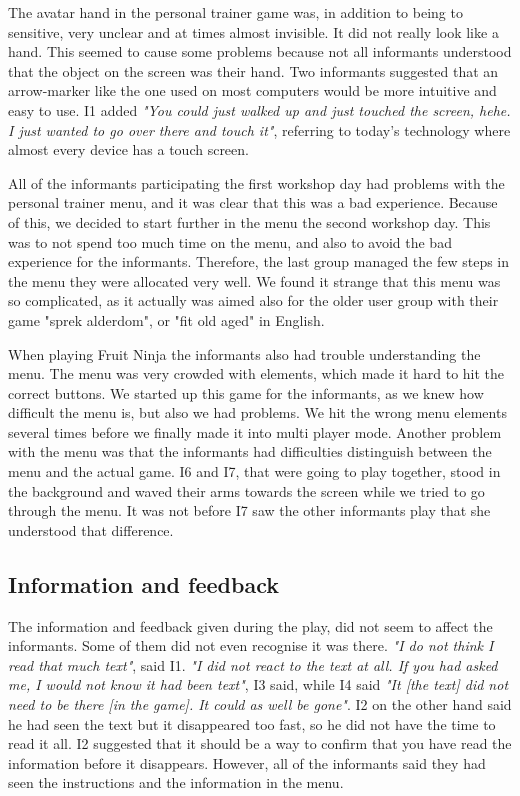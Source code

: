 The avatar hand in the personal trainer game was, in addition to being to sensitive, very unclear and at times almost invisible. It did not really look like a hand. This seemed to cause some problems because not all informants understood that the object on the screen was their hand. Two informants suggested that an arrow-marker like the one used on most computers would be more intuitive and easy to use. I1 added \emph{"You could just walked up and just touched the screen, hehe. I just wanted to go over there and touch it"}, referring to today's technology where almost every device has a touch screen.    

All of the informants participating the first workshop day had problems with the personal trainer menu, and it was clear that this was a bad experience. Because of this, we decided to start further in the menu the second workshop day. This was to not spend too much time on the menu, and also to avoid the bad experience for the informants. Therefore, the last group managed the few steps in the menu they were allocated very well. We found it strange that this menu was so complicated, as it actually was aimed also for the older user group with their game "sprek alderdom", or "fit old aged" in English. 

When playing Fruit Ninja the informants also had trouble understanding the menu. The menu was very crowded with elements, which made it hard to hit the correct buttons. We started up this game for the informants, as we knew how difficult the menu is, but also we had problems. We hit the wrong menu elements several times  before we finally made it into multi player mode. Another problem with the menu was that the informants had difficulties distinguish between the menu and the actual game. I6 and I7, that were going to play together, stood in the background and waved their arms towards the screen while we tried to go through the menu. It was not before I7 saw the other informants play that she understood that difference. 

\subsection{Information and feedback}
The information and feedback given during the play, did not seem to affect the informants. Some of them did not even recognise it was there. \emph{"I do not think I read that much text"}, said I1. \emph{"I did not react to the text at all. If you had asked me, I would not know it had been text"}, I3 said, while I4 said \emph{"It [the text] did not need to be there [in the game]. It could as well be gone"}. I2 on the other hand said he had seen the text but it disappeared too fast, so he did not have the time to read it all. I2 suggested that it should be a way to confirm that you have read the information before it disappears. However, all of the informants said they had seen the instructions and the information in the menu. 

